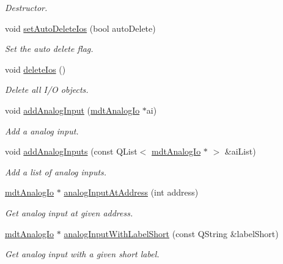 \begin{DoxyCompactItemize}
\begin{DoxyCompactList}\small\item\em Destructor. \end{DoxyCompactList}\item 
void \hyperlink{classmdt_device_ios_af771f8080ce4a7260baa0acccacae0e1}{setAutoDeleteIos} (bool autoDelete)
\begin{DoxyCompactList}\small\item\em Set the auto delete flag. \end{DoxyCompactList}\item 
void \hyperlink{classmdt_device_ios_a272fc1fa86e1b66e6af0e58b130939e0}{deleteIos} ()
\begin{DoxyCompactList}\small\item\em Delete all I/O objects. \end{DoxyCompactList}\item 
void \hyperlink{classmdt_device_ios_a0e2683630eff9410003a36ae5af76b52}{addAnalogInput} (\hyperlink{classmdt_analog_io}{mdtAnalogIo} $\ast$ai)
\begin{DoxyCompactList}\small\item\em Add a analog input. \end{DoxyCompactList}\item 
void \hyperlink{classmdt_device_ios_a776dc0508f88f8ea206801fc7472bfb2}{addAnalogInputs} (const QList$<$ \hyperlink{classmdt_analog_io}{mdtAnalogIo} $\ast$ $>$ \&aiList)
\begin{DoxyCompactList}\small\item\em Add a list of analog inputs. \end{DoxyCompactList}\item 
\hyperlink{classmdt_analog_io}{mdtAnalogIo} $\ast$ \hyperlink{classmdt_device_ios_ad74dc114cec2029aa9a14714f13666c7}{analogInputAtAddress} (int address)
\begin{DoxyCompactList}\small\item\em Get analog input at given address. \end{DoxyCompactList}\item 
\hyperlink{classmdt_analog_io}{mdtAnalogIo} $\ast$ \hyperlink{classmdt_device_ios_ae31753e23d7ab14073f852dca85c2f9e}{analogInputWithLabelShort} (const QString \&labelShort)
\begin{DoxyCompactList}\small\item\em Get analog input with a given short label. \end{DoxyCompactList}\item 

\end{DoxyCompactItemize}
